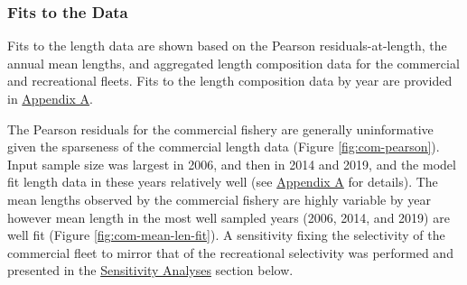 \documentclass[11pt,
  english,
  letterpaper,
]{article}
\begin{document}
\leavevmode\tagmcend\tagstructend\par


\hypertarget{fits-to-the-data}{%
\subsubsection{Fits to the Data}\label{fits-to-the-data}}

\leavevmode\tagmcend\tagstructend


Fits to the length data are shown based on the Pearson residuals-at-length, the annual mean lengths, and aggregated length composition data for the commercial and recreational fleets. Fits to the length composition data by year are provided in {\protect\hyperlink{append_a}{Appendix A}\leavevmode\tagmcend\tagstructend}.

\leavevmode\tagmcend\tagstructend\par


The Pearson residuals for the commercial fishery are generally uninformative given the sparseness of the commercial length data (Figure \ref{fig:com-pearson}). Input sample size was largest in 2006, and then in 2014 and 2019, and the model fit length data in these years relatively well (see {\protect\hyperlink{append_a}{Appendix A}\leavevmode\tagmcend\tagstructend} for details). The mean lengths observed by the commercial fishery are highly variable by year however mean length in the most well sampled years (2006, 2014, and 2019) are well fit (Figure \ref{fig:com-mean-len-fit}). A sensitivity fixing the selectivity of the commercial fleet to mirror that of the recreational selectivity was performed and presented in the {\protect\hyperlink{sensitivity-analyses}{Sensitivity Analyses}\leavevmode\tagmcend\tagstructend} section below.

\leavevmode\tagmcend\tagstructend\par

\end{document}
